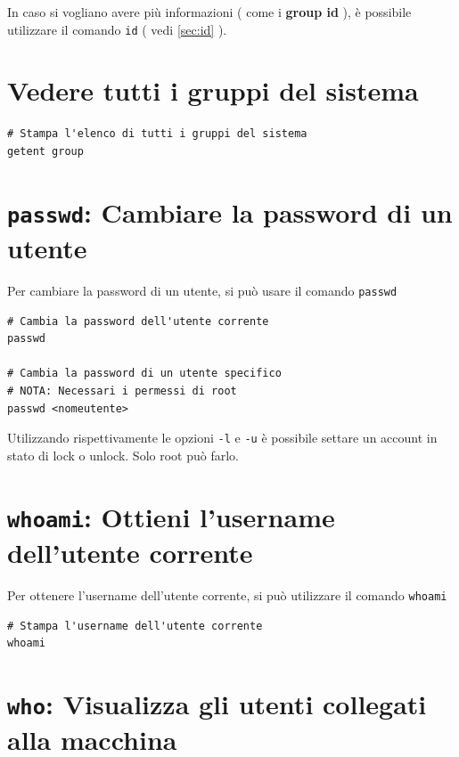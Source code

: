 \documentclass[a4paper]{report}
\newenvironment{info}{\begin{tcolorbox}[fonttitle=\sffamily\bfseries\large,title=Info,colframe=blue!75!white]}{\end{tcolorbox}}
\newenvironment{code}{\begin{tcolorbox}[size=small]}{\end{tcolorbox}}
\begin{document}
In caso si vogliano avere più informazioni ( come i \textbf{group id} ), è possibile utilizzare il comando \texttt{id} ( vedi \ref{sec:id} ).

\section{Vedere tutti i gruppi del sistema}

\begin{code} 
\begin{lstlisting}
# Stampa l'elenco di tutti i gruppi del sistema
getent group
\end{lstlisting}
\end{code}

\section{\texttt{passwd}: Cambiare la password di un utente}

Per cambiare la password di un utente, si può usare il comando \texttt{passwd}

\begin{code} 
\begin{lstlisting}
# Cambia la password dell'utente corrente
passwd

# Cambia la password di un utente specifico
# NOTA: Necessari i permessi di root
passwd <nomeutente>
\end{lstlisting}
\end{code}

\begin{info}
	Utilizzando rispettivamente le opzioni \texttt{-l} e \texttt{-u} è possibile settare un account in stato di lock o unlock. Solo root può farlo.
\end{info}

\section{\texttt{whoami}: Ottieni l'username dell'utente corrente}

Per ottenere l'username dell'utente corrente, si può utilizzare il comando \texttt{whoami}
\begin{code} 
\begin{lstlisting}
# Stampa l'username dell'utente corrente
whoami
\end{lstlisting}
\end{code}

\section{\texttt{who}: Visualizza gli utenti collegati alla macchina}
\end{document}
